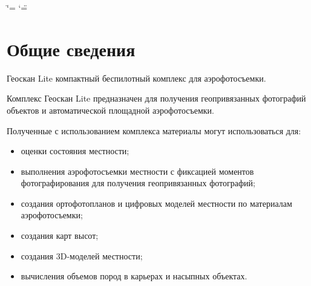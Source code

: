 \documentclass[a4paper,10pt,russian,openany]{sphinxmanual}
\title{}
\date{}
\author{}
\begin{document}
\ifdefined\shorthandoff
  \ifnum\catcode`\=\string=\active\shorthandoff{=}\fi
  \ifnum\catcode`\"=\active{}\fi
\fi

\pagestyle{empty}
\sphinxmaketitle
\pagestyle{plain}
\sphinxtableofcontents
\pagestyle{normal}
\label{\detokenize{index::doc}}



\chapter{Общие сведения}
\label{\detokenize{reference:id1}}\label{\detokenize{reference::doc}}

Геоскан Lite \textendash{} компактный беспилотный комплекс для аэрофотосъемки.


Комплекс Геоскан Lite предназначен для получения геопривязанных фотографий объектов и автоматической площадной аэрофотосъемки.


Полученные с использованием комплекса материалы могут использоваться для:
\begin{itemize}
\item {} 
оценки состояния местности;

\item {} 
выполнения аэрофотосъемки местности с фиксацией моментов фотографирования для получения геопривязанных фотографий;

\item {} 
создания ортофотопланов и цифровых моделей местности по материалам аэрофотосъемки;

\item {} 
создания карт высот;

\item {} 
создания 3D-моделей местности;

\item {} 
вычисления объемов пород в карьерах и насыпных объектах.

\end{itemize}
\end{document}
